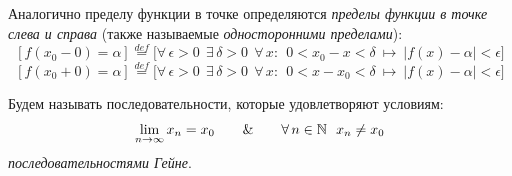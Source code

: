 \begin{definition}
Аналогично пределу функции в точке определяются \textit{пределы функции в точке слева и справа}
(также называемые \textit{односторонними пределами}):
\[
[f(x_{0} - 0) = \alpha] \overset{def}{=} \Big[ \forall \, \epsilon > 0 ~~ \exists \, \delta > 0 ~~
\forall \, x: ~~ 0 < x_{0} - x < \delta ~ \longmapsto ~ |f(x) - \alpha| < \epsilon \Big]
\]
\[
[f(x_{0} + 0) = \alpha] \overset{def}{=} \Big[ \forall \, \epsilon > 0 ~~ \exists \, \delta > 0 ~~
\forall \, x: ~~ 0 < x - x_{0} < \delta ~ \longmapsto ~ |f(x) - \alpha| < \epsilon \Big]
\]
\end{definition}

\begin{note}
Будем называть последовательности, которые удовлетворяют условиям:
\[
\lim\limits_{n \to \infty}{x_{n}} = x_{0} \qquad \&
\qquad \forall \, n \in \mathbb{N} ~~ x_{n} \neq x_{0}
\]
\textit{последовательностями Гейне}.
\end{note}

